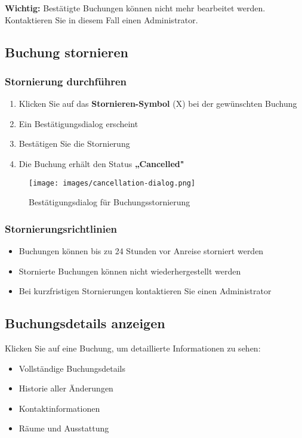 \textbf{Wichtig:} Bestätigte Buchungen können nicht mehr bearbeitet werden. Kontaktieren Sie in diesem Fall einen Administrator.

\subsection{Buchung stornieren}

\subsubsection{Stornierung durchführen}

\begin{enumerate}
    \item Klicken Sie auf das \textbf{Stornieren-Symbol} (X) bei der gewünschten Buchung
    \item Ein Bestätigungsdialog erscheint
    \item Bestätigen Sie die Stornierung
    \item Die Buchung erhält den Status \textbf{„Cancelled"}
\end{enumerate}

\begin{figure}[H]
    \centering
    \texttt{[image: images/cancellation-dialog.png]}
    \caption{Bestätigungsdialog für Buchungsstornierung}
    \label{fig:cancellation}
\end{figure}

\subsubsection{Stornierungsrichtlinien}

\begin{itemize}
    \item Buchungen können bis zu 24 Stunden vor Anreise storniert werden
    \item Stornierte Buchungen können nicht wiederhergestellt werden
    \item Bei kurzfristigen Stornierungen kontaktieren Sie einen Administrator
\end{itemize}

\subsection{Buchungsdetails anzeigen}

Klicken Sie auf eine Buchung, um detaillierte Informationen zu sehen:

\begin{itemize}
    \item Vollständige Buchungsdetails
    \item Historie aller Änderungen
    \item Kontaktinformationen
    \item Räume und Ausstattung
\end{itemize}

\newpage